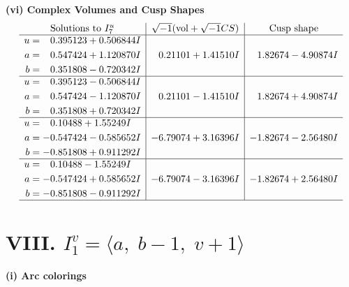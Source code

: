 \documentclass[1p]{elsarticle_modified}
\theoremstyle{definition}
\newcommand{\I}{\sqrt{-1}}
\begin{document}
\newpage\flushleft \textbf{(vi) Complex Volumes and Cusp Shapes}
$$\begin{array}{c|c|c}  
\text{Solutions to }I^u_{7}& \I (\text{vol} + \sqrt{-1}CS) & \text{Cusp shape}\\
 \hline 
\begin{aligned}
u &= \phantom{-}0.395123 + 0.506844 I \\
a &= \phantom{-}0.547424 + 1.120870 I \\
b &= \phantom{-}0.351808 - 0.720342 I\end{aligned}
 & \phantom{-}0.21101 + 1.41510 I & \phantom{-}1.82674 - 4.90874 I \\ \hline\begin{aligned}
u &= \phantom{-}0.395123 - 0.506844 I \\
a &= \phantom{-}0.547424 - 1.120870 I \\
b &= \phantom{-}0.351808 + 0.720342 I\end{aligned}
 & \phantom{-}0.21101 - 1.41510 I & \phantom{-}1.82674 + 4.90874 I \\ \hline\begin{aligned}
u &= \phantom{-}0.10488 + 1.55249 I \\
a &= -0.547424 - 0.585652 I \\
b &= -0.851808 + 0.911292 I\end{aligned}
 & -6.79074 + 3.16396 I & -1.82674 - 2.56480 I \\ \hline\begin{aligned}
u &= \phantom{-}0.10488 - 1.55249 I \\
a &= -0.547424 + 0.585652 I \\
b &= -0.851808 - 0.911292 I\end{aligned}
 & -6.79074 - 3.16396 I & -1.82674 + 2.56480 I\\
 \hline 
 \end{array}$$\newpage\newpage\renewcommand{\arraystretch}{1}
\centering \section*{VIII. $I^v_{1}= \langle a,\;b-1,\;v+1 \rangle$}
\flushleft \textbf{(i) Arc colorings}\\
\end{document}
